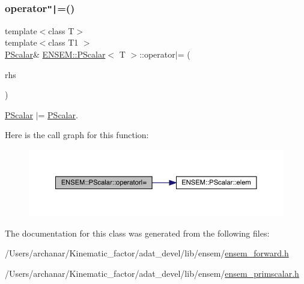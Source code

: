 \subsubsection{\texorpdfstring{operator\texttt{"|}=()}{operator|=()}\hspace{0.1cm}{\footnotesize\ttfamily [2/2]}}
{\footnotesize\ttfamily template$<$class T$>$ \\
template$<$class T1 $>$ \\
\mbox{\hyperlink{classENSEM_1_1PScalar}{P\+Scalar}}\& \mbox{\hyperlink{classENSEM_1_1PScalar}{E\+N\+S\+E\+M\+::\+P\+Scalar}}$<$ T $>$\+::operator$\vert$= (\begin{DoxyParamCaption}\item[{const \mbox{\hyperlink{classENSEM_1_1PScalar}{P\+Scalar}}$<$ T1 $>$ \&}]{rhs }\end{DoxyParamCaption})\hspace{0.3cm}{\ttfamily [inline]}}



\mbox{\hyperlink{classENSEM_1_1PScalar}{P\+Scalar}} $\vert$= \mbox{\hyperlink{classENSEM_1_1PScalar}{P\+Scalar}}. 

Here is the call graph for this function\+:
\nopagebreak
\begin{figure}[H]
\begin{center}
\leavevmode
\includegraphics[width=350pt]{d3/d27/classENSEM_1_1PScalar_a59ee3adbb8dabcfb25aae9f9390dcef0_cgraph}
\end{center}
\end{figure}


The documentation for this class was generated from the following files\+:\begin{DoxyCompactItemize}
\item 
/\+Users/archanar/\+Kinematic\+\_\+factor/adat\+\_\+devel/lib/ensem/\mbox{\hyperlink{lib_2ensem_2ensem__forward_8h}{ensem\+\_\+forward.\+h}}\item 
/\+Users/archanar/\+Kinematic\+\_\+factor/adat\+\_\+devel/lib/ensem/\mbox{\hyperlink{lib_2ensem_2ensem__primscalar_8h}{ensem\+\_\+primscalar.\+h}}\end{DoxyCompactItemize}
